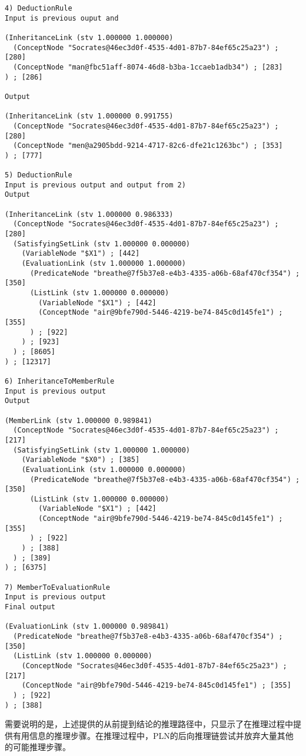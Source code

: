 {\begin{small}
\begin{lstlisting}
4) DeductionRule
Input is previous ouput and

(InheritanceLink (stv 1.000000 1.000000)
  (ConceptNode "Socrates@46ec3d0f-4535-4d01-87b7-84ef65c25a23") ; [280]
  (ConceptNode "man@fbc51aff-8074-46d8-b3ba-1ccaeb1adb34") ; [283]
) ; [286]

Output

(InheritanceLink (stv 1.000000 0.991755)
  (ConceptNode "Socrates@46ec3d0f-4535-4d01-87b7-84ef65c25a23") ; [280]
  (ConceptNode "men@a2905bdd-9214-4717-82c6-dfe21c1263bc") ; [353]
) ; [777]

5) DeductionRule
Input is previous output and output from 2)
Output

(InheritanceLink (stv 1.000000 0.986333)
  (ConceptNode "Socrates@46ec3d0f-4535-4d01-87b7-84ef65c25a23") ; [280]
  (SatisfyingSetLink (stv 1.000000 0.000000)
    (VariableNode "$X1") ; [442]
    (EvaluationLink (stv 1.000000 1.000000)
      (PredicateNode "breathe@7f5b37e8-e4b3-4335-a06b-68af470cf354") ; [350]
      (ListLink (stv 1.000000 0.000000)
        (VariableNode "$X1") ; [442]
        (ConceptNode "air@9bfe790d-5446-4219-be74-845c0d145fe1") ; [355]
      ) ; [922]
    ) ; [923]
  ) ; [8605]
) ; [12317]

6) InheritanceToMemberRule
Input is previous output
Output

(MemberLink (stv 1.000000 0.989841)
  (ConceptNode "Socrates@46ec3d0f-4535-4d01-87b7-84ef65c25a23") ; [217]
  (SatisfyingSetLink (stv 1.000000 1.000000)
    (VariableNode "$X0") ; [385]
    (EvaluationLink (stv 1.000000 0.000000)
      (PredicateNode "breathe@7f5b37e8-e4b3-4335-a06b-68af470cf354") ; [350]
      (ListLink (stv 1.000000 0.000000)
        (VariableNode "$X1") ; [442]
        (ConceptNode "air@9bfe790d-5446-4219-be74-845c0d145fe1") ; [355]
      ) ; [922]
    ) ; [388]
  ) ; [389]
) ; [6375]

7) MemberToEvaluationRule
Input is previous output
Final output

(EvaluationLink (stv 1.000000 0.989841)
  (PredicateNode "breathe@7f5b37e8-e4b3-4335-a06b-68af470cf354") ; [350]
  (ListLink (stv 1.000000 0.000000)
    (ConceptNode "Socrates@46ec3d0f-4535-4d01-87b7-84ef65c25a23") ; [217]
    (ConceptNode "air@9bfe790d-5446-4219-be74-845c0d145fe1") ; [355]
  ) ; [922]
) ; [388]
 \end{lstlisting}\end{small}}

\noindent 需要说明的是，上述提供的从前提到结论的推理路径中，只显示了在推理过程中提供有用信息的推理步骤。在推理过程中，PLN的后向推理链尝试并放弃大量其他的可能推理步骤。



